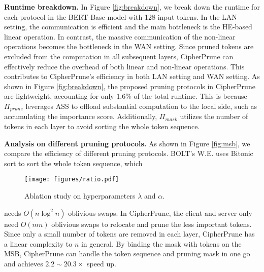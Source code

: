 

\noindent\textbf{Runtime breakdown.}
In Figure \ref{fig:breakdown}, we break down the runtime for each protocol in the BERT-Base model with 128 input tokens. In the LAN setting, the communication is efficient and the main bottleneck is the HE-based linear operation. In contrast, the massive communication of the non-linear operations becomes the bottleneck in the WAN setting. Since pruned tokens are excluded from the computation in all subsequent layers, CipherPrune can effectively reduce the overhead of both linear and non-linear operations. This contributes to CipherPrune's efficiency in both LAN setting and WAN setting. As shown in Figure \ref{fig:breakdown}, the proposed pruning protocols in CipherPrune are lightweight, accounting for only $1.6\%$ of the total runtime. This is because $\Pi_{prune}$ leverages ASS to offload substantial computation to the local side, such as accumulating the importance score. Additionally, $\Pi_{mask}$ utilizes the number of tokens in each layer to avoid sorting the whole token sequence.

\noindent\textbf{Analysis on different pruning protocols.}
As shown in Figure \ref{fig:msb}, we compare the efficiency of different pruning protocols. BOLT's W.E. uses Bitonic sort to sort the whole token sequence, which
\begin{wrapfigure}{r}{0.35\textwidth}  %
    \vspace{-0.15in}
    \centering
    \texttt{[image: figures/ratio.pdf]}
    \captionsetup{skip=2pt}
    \caption{Ablation study on hyperparameters $\lambda$ and $\alpha$.}
    \label{fig:param}
    \vspace{-0.2in}
\end{wrapfigure}
needs $O(n\log ^2 n)$ oblivious swaps. 
In CipherPrune, the client and server only need $O(mn)$ oblivious swaps to relocate and prune the less important tokens. Since only a small number of tokens are removed in each layer, CipherPrune has a linear complexity to $n$ in general. By binding the mask with tokens on the MSB, CipherPrune can handle the token sequence and pruning mask in one go and achieves $2.2\sim20.3\times$ speed up.

